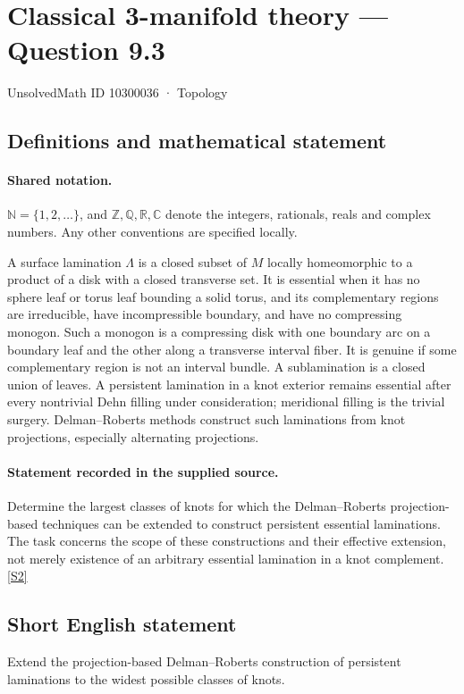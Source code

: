 \documentclass[11pt]{article}
\newcommand{\sref}[2]{\hyperlink{source:#1:#2}{[S#2]}}
\begin{document}
\setcounter{section}{10300035}
\section{Classical 3-manifold theory — Question 9.3}\label{10300036}
{\small\sffamily UnsolvedMath ID 10300036 · Topology}
\subsection{Definitions and mathematical statement}

\paragraph{Shared notation.}$\mathbb N=\{1,2,\ldots\}$, and $\mathbb Z,\mathbb Q,\mathbb R,\mathbb C$ denote the integers, rationals, reals and complex numbers. Any other conventions are specified locally.


A surface lamination $\Lambda$ is a closed subset of $M$ locally homeomorphic to a product of a disk with a closed transverse set. It is essential when it has no sphere leaf or torus leaf bounding a solid torus, and its complementary regions are irreducible, have incompressible boundary, and have no compressing monogon. Such a monogon is a compressing disk with one boundary arc on a boundary leaf and the other along a transverse interval fiber. It is genuine if some complementary region is not an interval bundle. A sublamination is a closed union of leaves. A persistent lamination in a knot exterior remains essential after every nontrivial Dehn filling under consideration; meridional filling is the trivial surgery. Delman--Roberts methods construct such laminations from knot projections, especially alternating projections.
\paragraph{Statement recorded in the supplied source.}
Determine the largest classes of knots for which the Delman--Roberts projection-based techniques can be extended to construct persistent essential laminations. The task concerns the scope of these constructions and their effective extension, not merely existence of an arbitrary essential lamination in a knot complement. \sref{10300036}{2}
\subsection{Short English statement}
Extend the projection-based Delman--Roberts construction of persistent laminations to the widest possible classes of knots.
\end{document}
